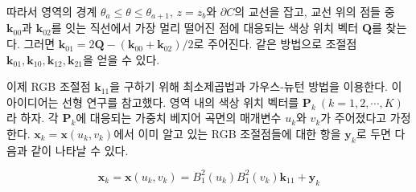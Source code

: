 \documentclass{gshs_thesis}
\theoremstyle{theorem}
\theoremstyle{lemma}
\theoremstyle{definition}
\begin{document}
따라서 영역의 경계 $\theta_a \leq \theta \leq \theta_{a+1}, \, z = z_b$와 $\partial C$의 교선을 잡고, 교선 위의 점들 중 $\mathbf{k}_{00}$과 $\mathbf{k}_{02}$를 잇는 직선에서 가장 멀리 떨어진 점에 대응되는 색상 위치 벡터 $\mathbf{Q}$를 찾는다. 그러면 $\mathbf{k}_{01} = 2\mathbf{Q} - (\mathbf{k}_{00} + \mathbf{k}_{02})/2$로 주어진다. 같은 방법으로 조절점 $\mathbf{k}_{01}, \mathbf{k}_{10}, \mathbf{k}_{12}, \mathbf{k}_{21}$을 얻을 수 있다. 

이제 RGB 조절점 $\mathbf{k}_{11}$을 구하기 위해 최소제곱법과 가우스-뉴턴 방법을 이용한다. 이 아이디어는 선형 연구를 참고했다. \cite{2021} 영역 내의 색상 위치 벡터를 $\mathbf{P}_k \ (k=1, 2, \cdots, K)$라 하자. 각 $\mathbf{P}_k$에 대응되는 가중치 베지어 곡면의 매개변수 $u_k$와 $v_k$가 주어졌다고 가정한다. $\mathbf{x}_k = \mathbf{x}(u_k, v_k)$에서 이미 알고 있는 RGB 조절점들에 대한 항을 $\mathbf{y}_k$로 두면 다음과 같이 나타날 수 있다.

$$ \mathbf{x}_k = \mathbf{x}(u_k, v_k) = B_1^2(u_k) B_1^2(v_k) \mathbf{k}_{11} + \mathbf{y}_k $$ 
\end{document}
